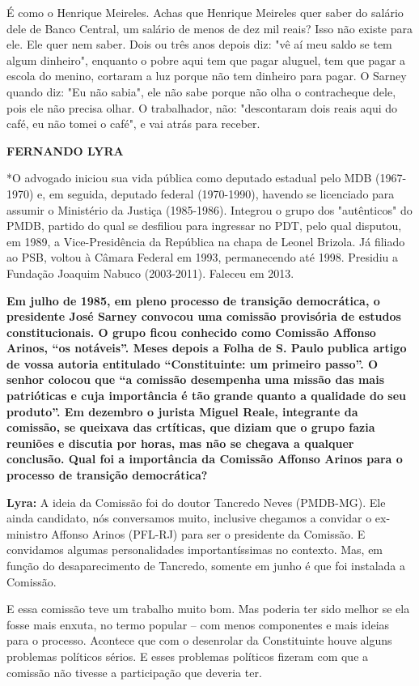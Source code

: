 É como o Henrique Meireles. Achas que Henrique Meireles quer saber do
salário dele de Banco Central, um salário de menos de dez mil reais?
Isso não existe para ele. Ele quer nem saber. Dois ou três anos depois
diz: "vê aí meu saldo se tem algum dinheiro", enquanto o pobre aqui tem
que pagar aluguel, tem que pagar a escola do menino, cortaram a luz
porque não tem dinheiro para pagar. O Sarney quando diz: "Eu não sabia",
ele não sabe porque não olha o contracheque dele, pois ele não precisa
olhar. O trabalhador, não: "descontaram dois reais aqui do café, eu não
tomei o café", e vai atrás para receber.

\textbf{FERNANDO LYRA}

*O advogado iniciou sua vida pública como deputado estadual pelo MDB
(1967-1970) e, em seguida, deputado federal (1970-1990), havendo se
licenciado para assumir o Ministério da Justiça (1985-1986). Integrou o
grupo dos "autênticos" do PMDB, partido do qual se desfiliou para
ingressar no PDT, pelo qual disputou, em 1989, a Vice-Presidência da
República na chapa de Leonel Brizola. Já filiado ao PSB, voltou à Câmara
Federal em 1993, permanecendo até 1998. Presidiu a Fundação Joaquim
Nabuco (2003-2011). Faleceu em 2013.

\textbf{Em julho de 1985, em pleno processo de transição democrática, o
presidente José Sarney convocou uma comissão provisória de estudos
constitucionais. O grupo ficou conhecido como Comissão Affonso Arinos,
``os notáveis''. Meses depois a Folha de S. Paulo publica artigo de
vossa autoria entitulado ``Constituinte: um primeiro passo''. O senhor
colocou que ``a comissão desempenha uma missão das mais patrióticas e
cuja importância é tão grande quanto a qualidade do seu produto''. Em
dezembro o jurista Miguel Reale, integrante da comissão, se queixava das
crtíticas, que diziam que o grupo fazia reuniões e discutia por horas,
mas não se chegava a qualquer conclusão. Qual foi a importância da
Comissão Affonso Arinos para o processo de transição democrática?}

\textbf{Lyra:} A ideia da Comissão foi do doutor Tancredo Neves
(PMDB-MG). Ele ainda candidato, nós conversamos muito, inclusive
chegamos a convidar o ex-ministro Affonso Arinos (PFL-RJ) para ser o
presidente da Comissão. E convidamos algumas personalidades
importantíssimas no contexto. Mas, em função do desaparecimento de
Tancredo, somente em junho é que foi instalada a Comissão.

E essa comissão teve um trabalho muito bom. Mas poderia ter sido melhor
se ela fosse mais enxuta, no termo popular -- com menos componentes e
mais ideias para o processo. Acontece que com o desenrolar da
Constituinte houve alguns problemas políticos sérios. E esses problemas
políticos fizeram com que a comissão não tivesse a participação que
deveria ter.

